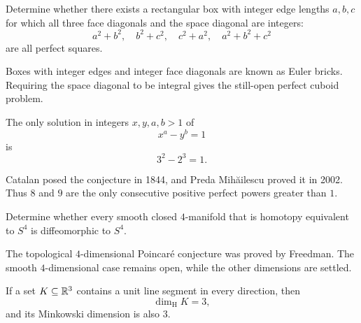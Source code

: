     \begin{openproblem}
        Determine whether there exists a rectangular box with integer edge
        lengths $a,b,c$ for which all three face diagonals and the space
        diagonal are integers:
        \[
            a^2+b^2,\quad
            b^2+c^2,\quad
            c^2+a^2,\quad
            a^2+b^2+c^2
        \]
        are all perfect squares.
    \end{openproblem}

    \begin{remark}
        Boxes with integer edges and integer face diagonals are known as Euler
        bricks. Requiring the space diagonal to be integral gives the still-open
        perfect cuboid problem.
    \end{remark}

    \begin{theorem}
        The only solution in integers $x,y,a,b>1$ of
        \[
            x^a-y^b=1
        \]
        is
        \[
            3^2-2^3=1.
        \]
    \end{theorem}

    \begin{remark}
        Catalan posed the conjecture in 1844, and Preda Mihăilescu proved it in
        2002. Thus $8$ and $9$ are the only consecutive positive perfect powers
        greater than $1$.
    \end{remark}

    \begin{openproblem}
        Determine whether every smooth closed $4$-manifold that is homotopy
        equivalent to $S^4$ is diffeomorphic to $S^4$.
    \end{openproblem}

    \begin{remark}
        The topological $4$-dimensional Poincaré conjecture was proved by
        Freedman. The smooth $4$-dimensional case remains open, while the other
        dimensions are settled.
    \end{remark}

    \begin{theorem}
        If a set $K\subseteq\mathbb{R}^3$ contains a unit line segment in every
        direction, then
        \[
            \dim_{\mathrm{H}}K=3,
        \]
        and its Minkowski dimension is also $3$.
    \end{theorem}

